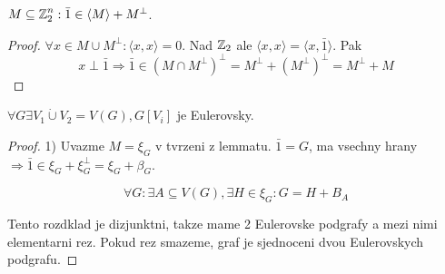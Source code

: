 \begin{lemma}
	$M \subseteq \operatorname{\mathbb{Z}}_2^n : \bar{1} \in \langle M \rangle + M^{\perp}$.
\end{lemma}
\begin{proof}
	$\forall x \in M \cup M^{\perp}: \langle x, x \rangle = 0$. Nad $\operatorname{\mathbb{Z}}_2$ ale $\langle x, x \rangle = \langle x, \bar{1} \rangle$. Pak
	\[ x \perp \bar{1} \Rightarrow \bar{1} \in (M \cap M^{\perp})^{\perp} = M^{\perp} + (M^{\perp})^{\perp} = M^{\perp} + M \]
\end{proof}

\begin{theorem}
	$\forall G \exists V_1 \mathbin{\dot{\cup}} V_2 = V(G), G[V_i]$ je Eulerovsky.
\end{theorem}
\begin{proof}
	1) Uvazme $M = \xi_G$ v tvrzeni z lemmatu. $\bar{1} = G$, ma vsechny hrany $\Rightarrow \bar{1} \in \xi_G + \xi_G^{\perp} = \xi_G + \beta_G$.

	\[ \forall G: \exists A \subseteq V(G), \exists H\in \xi_G: G = H + B_A \]

	Tento rozdklad je dizjunktni, takze mame 2 Eulerovske podgrafy a mezi nimi elementarni rez. Pokud rez smazeme, graf je sjednoceni dvou Eulerovskych podgrafu.

\end{proof}
